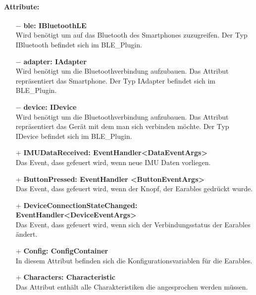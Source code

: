 \documentclass[a4paper,12pt]{article}
\begin{document}
\paragraph{Attribute:}
\begin{itemize}
	\item[$-$] \textbf{ble: IBluetoothLE}\\ Wird benötigt um auf das Bluetooth des Smartphones zuzugreifen. Der Typ IBluetooth befindet sich im BLE\_Plugin.
	\item[$-$] \textbf{adapter: IAdapter}\\ Wird benötigt um die Bluetoothverbindung aufzubauen. Das Attribut repräsentiert das Smartphone. Der Typ  IAdapter befindet sich im BLE\_Plugin.
	\item[$-$] \textbf{device: IDevice}\\ Wird benötigt um die Bluetoothverbindung aufzubauen. Das Attribut repräsentiert das Gerät mit dem man sich verbinden möchte. Der Typ  IDevice befindet sich im BLE\_Plugin.
	\item[+] \textbf{IMUDataReceived: EventHandler<DataEventArgs>}\\Das Event, dass gefeuert wird, wenn neue IMU Daten vorliegen.
	\item[+] \textbf{ButtonPressed: EventHandler <ButtonEventArgs>}\\ Das Event, dass gefeuert wird, wenn der Knopf, der Earables gedrückt wurde.
	\item[+] \textbf{DeviceConnectionStateChanged: EventHandler<DeviceEventArgs>}\\ Das Event, dass gefeuert wird, wenn sich der Verbindungsstatus der Earables ändert.
	\item[+] \textbf{Config: ConfigContainer}\\ In diesem Attribut befinden sich die Konfigurationsvariablen für die \Gls{Earables}.
	\item[+] \textbf{Characters: Characteristic}\\ Das Attribut enthält alle Charakteristiken die angesprochen werden müssen.
\end{itemize}
\end{document}
